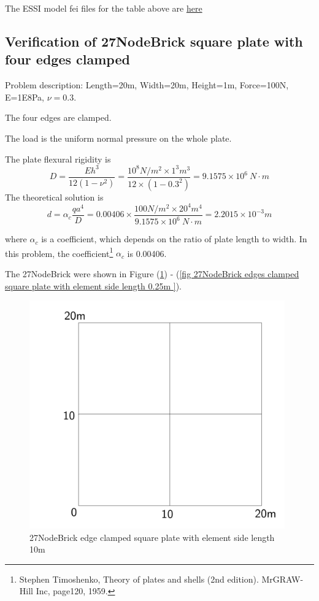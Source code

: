 \documentclass[fleqn,11pt]{article}
\begin{document}
The ESSI model fei files for the table above are \href{https://github.com/yuan-energy/ESSI_Verification/blob/master/27NodeBrick/cantilever_stress/cantilever_stress.tar.gz?raw=true}{here}




\newpage
\subsection{Verification of 27NodeBrick square plate with four edges clamped}

Problem description: Length=20m, Width=20m, Height=1m, Force=100N, E=1E8Pa, $\nu=0.3$. 

The four edges are clamped. 

The load is the uniform normal pressure on the whole plate. 


The plate flexural rigidity is 
\begin{equation}
  D=\frac{Eh^3}{12(1-\nu^2)}=\frac{10^8 N/m^2 \times 1^3 m^3 }{12 \times (1-0.3^2) }= 9.1575 \times 10^6 \ N\cdot m
\end{equation}
The theoretical solution is 
\begin{equation}
  d=\alpha_c \frac{q a^4}{D}=0.00406\times \frac{100 N/m^2 \times 20^4 m^4}{9.1575 \times 10^6 \ N\cdot m}=2.2015\times 10^{-3} m
\end{equation}

where $\alpha_c$ is a coefficient, which depends on the ratio of plate length to width. In this problem, the coefficient\footnote{Stephen Timoshenko, Theory of plates and shells (2nd edition). MrGRAW-Hill Inc, page120, 1959.} $\alpha_c$ is 0.00406.

The 27NodeBrick were shown in Figure (\ref{fig 27NodeBrick edges clamped square plate with element side length 10m }) - (\ref{fig 27NodeBrick edges clamped square plate with element side length 0.25m }). 


\begin{figure}[H]
  \centering
  \includegraphics[width=11cm]{../Figure-files/square_plate1.pdf}
  \caption{27NodeBrick edge clamped square plate with element side length 10m }
  \label{fig 27NodeBrick edges clamped square plate with element side length 10m }
\end{figure}
\end{document}
